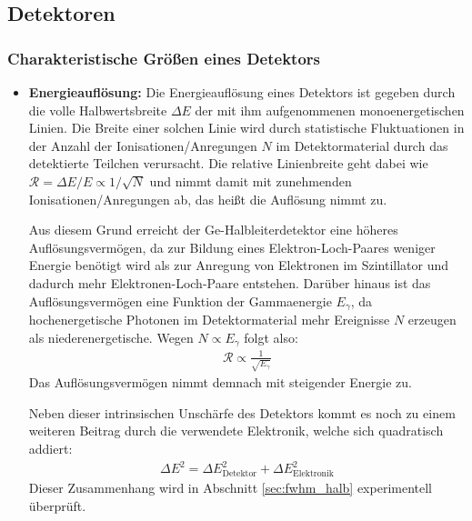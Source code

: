 \documentclass[11pt, a4paper]{article}
\numberwithin{equation}{section}
\begin{document}
\subsection{Detektoren}

\subsubsection{Charakteristische Größen eines Detektors}
\begin{itemize}
	\item \textbf{Energieauflösung:} 
	Die Energieauflösung eines Detektors ist gegeben durch die volle Halbwertsbreite $\Delta E$ der mit ihm aufgenommenen monoenergetischen Linien.
	Die Breite einer solchen Linie wird durch statistische Fluktuationen in der Anzahl der Ionisationen/Anregungen $N$ im Detektormaterial durch das detektierte Teilchen verursacht.
	Die relative Linienbreite geht dabei wie $\mathcal{R} = \Delta E / E \propto 1 / \sqrt{N}$ und nimmt damit mit zunehmenden Ionisationen/Anregungen ab, das heißt die Auflösung nimmt zu.
	
	Aus diesem Grund erreicht der Ge-Halbleiterdetektor eine höheres Auflösungsvermögen, da zur Bildung eines Elektron-Loch-Paares weniger Energie benötigt wird als zur Anregung von Elektronen im Szintillator und dadurch mehr Elektronen-Loch-Paare entstehen.
	Darüber hinaus ist das Auflösungsvermögen eine Funktion der Gammaenergie $E_\gamma$, da hochenergetische Photonen im Detektormaterial mehr Ereignisse $N$ erzeugen als niederenergetische. Wegen $N \propto E_\gamma$ folgt also:
	\begin{align*}
		\mathcal{R} \propto \frac{1}{\sqrt{E_\gamma}}
	\end{align*}
	Das Auflösungsvermögen nimmt demnach mit steigender Energie zu.
	
	Neben dieser intrinsischen Unschärfe des Detektors kommt es noch zu einem weiteren Beitrag durch die verwendete Elektronik, welche sich quadratisch addiert:
	\begin{align*}
		\Delta E^2 = \Delta E_\mathrm{Detektor}^2 + \Delta E_\mathrm{Elektronik}^2
	\end{align*}
	Dieser Zusammenhang wird in Abschnitt \ref{sec:fwhm_halb} experimentell überprüft.
	

\end{itemize}
\end{document}
